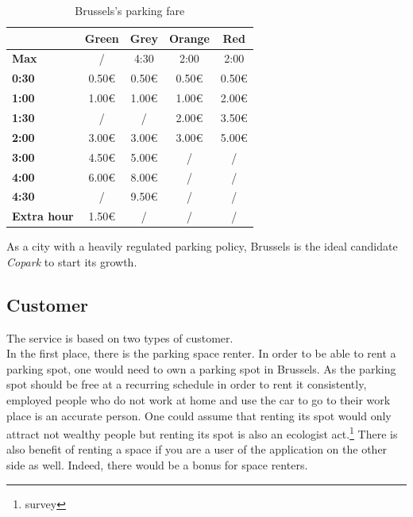 \documentclass[12pt,a4paper,oneside]{book}
\newcommand{\bp}{\textit{Copark }}
\begin{document}
\begin{table}[h]
\centering
\caption{Brussels's parking fare}
\label{bxfare}
\begin{tabular}{@{}lcccc@{}}
\cmidrule(l){2-5}
\textbf{}                                 & \textbf{Green} & \textbf{Grey} & \textbf{Orange} & \textbf{Red} \\ \midrule
\multicolumn{1}{l}{\textbf{Max}}        & /              & 4:30          & 2:00            & 2:00         \\ \midrule
\multicolumn{1}{l}{\textbf{0:30}}       & 0.50\euro{}           & 0.50\euro{}          & 0.50\euro{}            & 0.50\euro{}         \\ \midrule
\multicolumn{1}{l}{\textbf{1:00}}       & 1.00\euro{}           & 1.00\euro{}          & 1.00\euro{}            & 2.00\euro{}         \\ \midrule
\multicolumn{1}{l}{\textbf{1:30}}       & /              & /             & 2.00\euro{}            & 3.50\euro{}         \\ \midrule
\multicolumn{1}{l}{\textbf{2:00}}       & 3.00\euro{}           & 3.00\euro{}          & 3.00\euro{}            & 5.00\euro{}         \\ \midrule
\multicolumn{1}{l}{\textbf{3:00}}       & 4.50\euro{}           & 5.00\euro{}          & /               & /            \\ \midrule
\multicolumn{1}{l}{\textbf{4:00}}       & 6.00\euro{}           & 8.00\euro{}          & /               & /            \\ \midrule
\multicolumn{1}{l}{\textbf{4:30}}       & /              & 9.50\euro{}          & /               & /            \\ \midrule
\multicolumn{1}{l}{\textbf{Extra hour}} & 1.50\euro{}           & /             & /               & /            \\ \bottomrule
\end{tabular}
\end{table}

As a city with a heavily regulated parking policy, Brussels is the ideal candidate \bp to start its growth.

\subsection{Customer}
The service is based on two types of customer.\\

In the first place, there is the parking space renter. In order to be able to rent a parking spot, one would need to own a parking spot in Brussels. As the parking spot should be free at a recurring schedule in order to rent it consistently, employed people who do not work at home and use the car to go to their work place is an accurate person. One could assume that renting its spot would only attract not wealthy people but renting its spot is also an ecologist act.\footnote{survey} There is also benefit of renting a space if you are a user of the application on the other side as well. Indeed, there would be a bonus for space renters.\\
\end{document}
